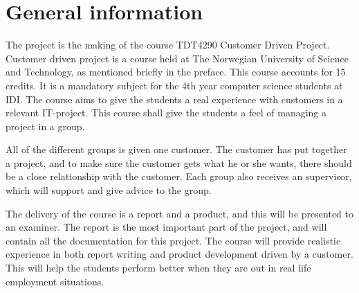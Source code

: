 \section{General information}

The project is the making of the course TDT4290 Customer Driven Project. 
Customer driven project is a course held at The Norwegian University of Science and Technology, as mentioned briefly in the preface. 
This course accounts for 15 credits. 
It is a mandatory subject for the 4th year computer science students at IDI. 
The course aims to give the students a real experience with customers in a relevant IT-project. 
This course shall give the students a feel of managing a project in a group. 


All of the different groups is given one customer. 
The customer has put together a project, and to make sure the customer gets what he or she wants, there should be a close relationship with the customer.
Each group also receives an supervisor, which will support and give advice to the group. 


The delivery of the course is a report and a product, and this will be presented to an examiner. 
The report is the most important part of the project, and will contain all the documentation for this project. The course will provide realistic experience in both report writing and product development driven by a customer. 
This will help the students perform better when they are out in real life employment situations.


